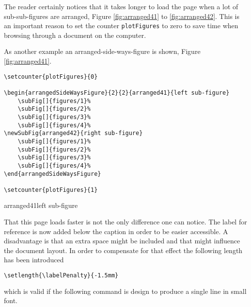 \documentclass[12pt,a4paper]{article}
\newcommand{\comm}[1]{\texttt{#1}}
\begin{document}
    \renewcommand{\subfigbottomskip}{10pt}%
    \renewcommand{\subfigcapskip}{10pt}%
    \renewcommand{\subcapsize}{\footnotesize}%


The reader certainly notices that it takes longer to load the page when a lot
of sub-sub-figures are arranged, Figure \ref{fig:arranged41} to \ref{fig:arranged42}. 
This is an important reason to set the counter \comm{plotFigures} to zero to save 
time when browsing through a document on the computer.

As another example an arranged-side-ways-figure is shown, Figure \ref{fig:arranged41}. 

\begin{verbatim}
\setcounter{plotFigures}{0}

\begin{arrangedSideWaysFigure}{2}{2}{arranged41}{left sub-figure}
    \subFig[]{figures/1}%
    \subFig[]{figures/2}%
    \subFig[]{figures/3}%
    \subFig[]{figures/4}%
\newSubFig{arranged42}{right sub-figure}
    \subFig[]{figures/1}%
    \subFig[]{figures/2}%
    \subFig[]{figures/3}%
    \subFig[]{figures/4}%
\end{arrangedSideWaysFigure}

\setcounter{plotFigures}{1}
\end{verbatim}



\setcounter{plotFigures}{0}
\begin{arrangedSideWaysFigure}{2}{2}{arranged41}{left sub-figure}
\end{arrangedSideWaysFigure}
\setcounter{plotFigures}{1}


That this page loads faster is not the only difference one can notice. The label for 
reference is now added below the caption in order to be easier accessible. A disadvantage 
is that an extra space might be included and that might influence the document layout. In order to
compensate for that effect the following length has been introduced

\begin{verbatim}
\setlength{\labelPenalty}{-1.5mm}
\end{verbatim}

which is valid if the following command is design to produce a single line in small font.
\end{document}
